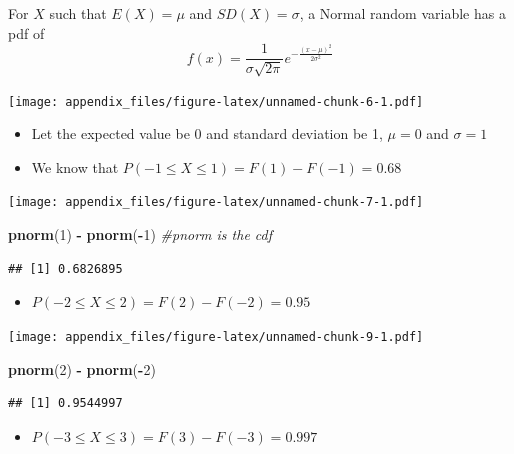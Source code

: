 \documentclass[
]{book}
\newenvironment{Shaded}{\begin{snugshade}}{\end{snugshade}}
\newcommand{\CommentTok}[1]{\textcolor[rgb]{0.56,0.35,0.01}{\textit{#1}}}
\newcommand{\DecValTok}[1]{\textcolor[rgb]{0.00,0.00,0.81}{#1}}
\newcommand{\FunctionTok}[1]{\textcolor[rgb]{0.13,0.29,0.53}{\textbf{#1}}}
\newcommand{\NormalTok}[1]{#1}
\newcommand{\SpecialCharTok}[1]{\textcolor[rgb]{0.81,0.36,0.00}{\textbf{#1}}}
\providecommand{\tightlist}{%
  \setlength{\itemsep}{0pt}\setlength{\parskip}{0pt}}
\begin{document}
For \(X\) such that \(E(X) = \mu\) and \(SD(X) = \sigma\), a Normal random variable has a pdf of
\[f(x) =  \frac{1}{\sigma\sqrt{2\pi}}e^{-\frac{(x-\mu)^2}{2\sigma^2}}\]

\texttt{[image: appendix\_files/figure-latex/unnamed-chunk-6-1.pdf]}

\begin{itemize}
\item
  Let the expected value be 0 and standard deviation be 1, \(\mu = 0\) and \(\sigma = 1\)
\item
  We know that \(P(-1\leq X \leq 1) = F(1) - F(-1) = 0.68\)
\end{itemize}

\texttt{[image: appendix\_files/figure-latex/unnamed-chunk-7-1.pdf]}

\begin{Shaded}
\begin{Highlighting}[]
\FunctionTok{pnorm}\NormalTok{(}\DecValTok{1}\NormalTok{) }\SpecialCharTok{{-}} \FunctionTok{pnorm}\NormalTok{(}\SpecialCharTok{{-}}\DecValTok{1}\NormalTok{) }\CommentTok{\#pnorm is the cdf}
\end{Highlighting}
\end{Shaded}

\begin{verbatim}
## [1] 0.6826895
\end{verbatim}

\begin{itemize}
\tightlist
\item
  \(P(-2\leq X \leq 2) = F(2) - F(-2) = 0.95\)
\end{itemize}

\texttt{[image: appendix\_files/figure-latex/unnamed-chunk-9-1.pdf]}

\begin{Shaded}
\begin{Highlighting}[]
\FunctionTok{pnorm}\NormalTok{(}\DecValTok{2}\NormalTok{) }\SpecialCharTok{{-}} \FunctionTok{pnorm}\NormalTok{(}\SpecialCharTok{{-}}\DecValTok{2}\NormalTok{)}
\end{Highlighting}
\end{Shaded}

\begin{verbatim}
## [1] 0.9544997
\end{verbatim}

\begin{itemize}
\tightlist
\item
  \(P(-3\leq X \leq 3) = F(3) - F(-3) = 0.997\)
\end{itemize}
\end{document}
